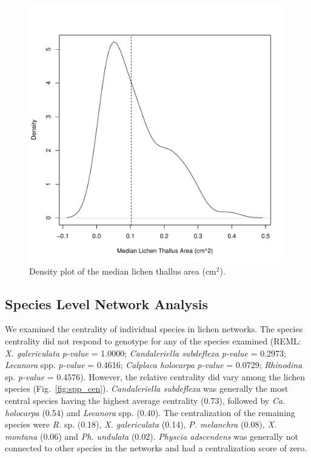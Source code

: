 \documentclass[11pt,onecolumn,lineno]{olplainarticle}
\begin{document}
\begin{figure}[ht]
\centering
\includegraphics[width=\linewidth]{xg_size.pdf}
\caption{Density plot of the median lichen thallus area (cm$^2$). }
\label{fig:SI_xg_median}
\end{figure}




\subsection*{Species Level Network Analysis}


We examined the centrality of individual species in lichen
networks. The species centrality did not respond to genotype for any
of the species examined (REML: \textit{X. galericulata}
\textit{p-value} = 1.0000; \textit{Candaleriella subdeflexa}
\textit{p-value} = 0.2973; \textit{Lecanora} spp. \textit{p-value} =
0.4616; \textit{Calplaca holocarpa} \textit{p-value} = 0.0729;
\textit{Rhinodina} sp. \textit{p-value} = 0.4576). However, the
relative centrality did vary among the lichen species
(Fig.~\ref{fig:spp_cen}). \textit{Candaleriella subdeflexa} was
generally the most central species having the highest average
centrality (0.73), followed by \textit{Ca. holocarpa} (0.54) and
\textit{Lecanora} spp. (0.40). The centralization of the remaining
species were \textit{R.}  sp. (0.18), \textit{X. galericulata} (0.14),
\textit{P. melanchra} (0.08), \textit{X. montana} (0.06) and
\textit{Ph. undulata} (0.02). \textit{Physcia adscendens} was
generally not connected to other species in the networks and had a
centralization score of zero.
\end{document}

